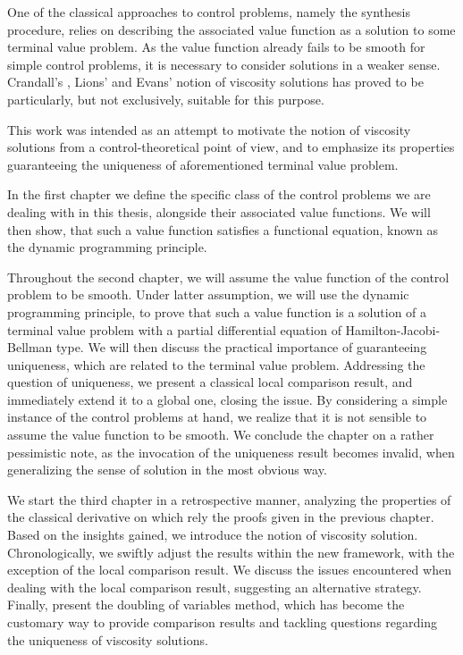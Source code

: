 \newpage

One of the classical approaches to control problems, namely the synthesis procedure, relies on describing the associated value function as a solution to some terminal value problem. As the value function already fails to be smooth for simple control problems, it is necessary to consider solutions in a weaker sense.
Crandall's \cite{lions}, Lions' \cite{lions1982fully, lions1982generalized} and Evans' \cite{crandall1984some} notion of viscosity solutions has proved to be particularly, but not exclusively, suitable for this purpose.

This work was intended as an attempt to motivate the notion of viscosity solutions from a control-theoretical point of view, and to emphasize its properties guaranteeing the uniqueness of aforementioned terminal value problem. 

In the first chapter we define the specific class of the control problems we are dealing with in this thesis, alongside their associated value functions. We will then show, that such a value function satisfies a functional equation, known as the dynamic programming principle.

Throughout the second chapter, we will assume the value function of the control problem to be smooth. Under latter assumption, we will use the dynamic programming principle, to prove that such a value function is a solution of a terminal value problem with a partial differential equation of Hamilton-Jacobi-Bellman type. We will then discuss the practical importance of guaranteeing uniqueness, which are related to the terminal value problem. Addressing the question of uniqueness, we present a classical local comparison result, and immediately extend it to a global one, closing the issue. By considering a simple instance of the control problems at hand, we realize that it is not sensible to assume the value function to be smooth. We conclude the chapter on a rather pessimistic note, as the invocation of the uniqueness result becomes invalid, when generalizing the sense of solution in the most obvious way.

We start the third chapter in a retrospective manner, analyzing the properties of the classical derivative on which rely the proofs given in the previous chapter. Based on the insights gained, we introduce the notion of viscosity solution. Chronologically, we swiftly adjust the results within the new framework, with the exception of the local comparison result. We discuss the issues encountered when dealing with the local comparison result, suggesting an alternative strategy. Finally, present the doubling of variables method, which has become the customary way to provide comparison results and tackling questions regarding the uniqueness of viscosity solutions.

